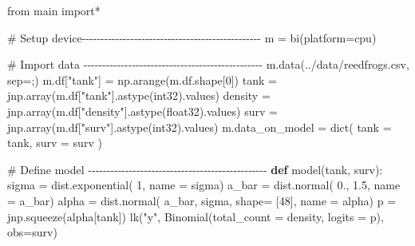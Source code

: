 \documentclass[
  letterpaper,
  DIV=11,
  numbers=noendperiod]{scrreprt}
\newenvironment{Shaded}{\begin{snugshade}}{\end{snugshade}}
\newcommand{\BuiltInTok}[1]{\textcolor[rgb]{0.00,0.23,0.31}{#1}}
\newcommand{\CommentTok}[1]{\textcolor[rgb]{0.37,0.37,0.37}{#1}}
\newcommand{\DecValTok}[1]{\textcolor[rgb]{0.68,0.00,0.00}{#1}}
\newcommand{\FloatTok}[1]{\textcolor[rgb]{0.68,0.00,0.00}{#1}}
\newcommand{\ImportTok}[1]{\textcolor[rgb]{0.00,0.46,0.62}{#1}}
\newcommand{\KeywordTok}[1]{\textcolor[rgb]{0.00,0.23,0.31}{\textbf{#1}}}
\newcommand{\NormalTok}[1]{\textcolor[rgb]{0.00,0.23,0.31}{#1}}
\newcommand{\OperatorTok}[1]{\textcolor[rgb]{0.37,0.37,0.37}{#1}}
\newcommand{\StringTok}[1]{\textcolor[rgb]{0.13,0.47,0.30}{#1}}
\begin{document}
\begin{Shaded}
\begin{Highlighting}[]
\ImportTok{from}\NormalTok{ main }\ImportTok{import}\OperatorTok{*}

\CommentTok{\# Setup device{-}{-}{-}{-}{-}{-}{-}{-}{-}{-}{-}{-}{-}{-}{-}{-}{-}{-}{-}{-}{-}{-}{-}{-}{-}{-}{-}{-}{-}{-}{-}{-}{-}{-}{-}{-}{-}{-}{-}{-}{-}{-}{-}{-}{-}{-}{-}{-}}
\NormalTok{m }\OperatorTok{=}\NormalTok{ bi(platform}\OperatorTok{=}\StringTok{\textquotesingle{}cpu\textquotesingle{}}\NormalTok{)}

\CommentTok{\# Import data {-}{-}{-}{-}{-}{-}{-}{-}{-}{-}{-}{-}{-}{-}{-}{-}{-}{-}{-}{-}{-}{-}{-}{-}{-}{-}{-}{-}{-}{-}{-}{-}{-}{-}{-}{-}{-}{-}{-}{-}{-}{-}{-}{-}{-}{-}{-}{-}}
\NormalTok{m.data(}\StringTok{\textquotesingle{}../data/reedfrogs.csv\textquotesingle{}}\NormalTok{, sep}\OperatorTok{=}\StringTok{\textquotesingle{};\textquotesingle{}}\NormalTok{) }
\NormalTok{m.df[}\StringTok{"tank"}\NormalTok{] }\OperatorTok{=}\NormalTok{ np.arange(m.df.shape[}\DecValTok{0}\NormalTok{])}
\NormalTok{tank }\OperatorTok{=}\NormalTok{ jnp.array(m.df[}\StringTok{"tank"}\NormalTok{].astype(}\StringTok{\textquotesingle{}int32\textquotesingle{}}\NormalTok{).values)}
\NormalTok{density }\OperatorTok{=}\NormalTok{ jnp.array(m.df[}\StringTok{"density"}\NormalTok{].astype(}\StringTok{\textquotesingle{}float32\textquotesingle{}}\NormalTok{).values)}
\NormalTok{surv }\OperatorTok{=}\NormalTok{ jnp.array(m.df[}\StringTok{"surv"}\NormalTok{].astype(}\StringTok{\textquotesingle{}int32\textquotesingle{}}\NormalTok{).values)}
\NormalTok{m.data\_on\_model }\OperatorTok{=} \BuiltInTok{dict}\NormalTok{(}
\NormalTok{    tank }\OperatorTok{=}\NormalTok{ tank,}
\NormalTok{    surv }\OperatorTok{=}\NormalTok{ surv}
\NormalTok{)}

\CommentTok{\# Define model {-}{-}{-}{-}{-}{-}{-}{-}{-}{-}{-}{-}{-}{-}{-}{-}{-}{-}{-}{-}{-}{-}{-}{-}{-}{-}{-}{-}{-}{-}{-}{-}{-}{-}{-}{-}{-}{-}{-}{-}{-}{-}{-}{-}{-}{-}{-}{-}}
\KeywordTok{def}\NormalTok{ model(tank, surv):}
\NormalTok{    sigma }\OperatorTok{=}\NormalTok{ dist.exponential( }\DecValTok{1}\NormalTok{,  name }\OperatorTok{=} \StringTok{\textquotesingle{}sigma\textquotesingle{}}\NormalTok{)}
\NormalTok{    a\_bar }\OperatorTok{=}\NormalTok{ dist.normal( }\FloatTok{0.}\NormalTok{, }\FloatTok{1.5}\NormalTok{, name }\OperatorTok{=} \StringTok{\textquotesingle{}a\_bar\textquotesingle{}}\NormalTok{)}
\NormalTok{    alpha }\OperatorTok{=}\NormalTok{ dist.normal( a\_bar, sigma, shape}\OperatorTok{=}\NormalTok{ [}\DecValTok{48}\NormalTok{], name }\OperatorTok{=} \StringTok{\textquotesingle{}alpha\textquotesingle{}}\NormalTok{)}
\NormalTok{    p }\OperatorTok{=}\NormalTok{ jnp.squeeze(alpha[tank])}
\NormalTok{    lk(}\StringTok{"y"}\NormalTok{, Binomial(total\_count }\OperatorTok{=}\NormalTok{ density, logits }\OperatorTok{=}\NormalTok{ p), obs}\OperatorTok{=}\NormalTok{surv)}


\end{Highlighting}
\end{Shaded}
\end{document}
